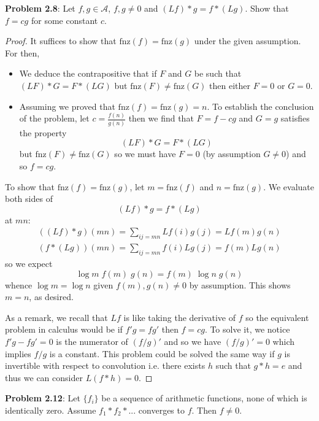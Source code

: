 \documentclass{article}
\newcommand{\fnz}{\text{fnz}}
\newcommand{\A}{\mathcal{A}}
\begin{document}
\textbf{Problem 2.8}: Let $f, g \in \A$, $f, g \not= 0$ and $(Lf) * g = f * (Lg)$. Show that $f = cg$ for some constant $c$.

\begin{proof}
It suffices to show that $\fnz(f) = \fnz(g)$ under the given assumption. For then,
\begin{itemize}
\item We deduce the contrapositive that if $F$ and $G$ be such that $(LF) * G = F * (LG)$ but $\fnz(F) \not= \fnz(G)$ then either $F = 0$ or $G = 0$.
\item Assuming we proved that $\fnz(f) = \fnz(g) = n$. To establish the conclusion of the problem, let $c = \frac{f(n)}{g(n)}$ then we find that $F = f - cg$ and $G = g$ satisfies the property
$$(L F) * G = F * (L G)$$
but $\fnz(F) \not= \fnz(G)$ so we must have $F = 0$ (by assumption $G \not= 0$) and so $f = cg$.
\end{itemize}

To show that $\fnz(f) = \fnz(g)$, let $m = \fnz(f)$ and $n = \fnz(g)$. We evaluate both sides of
$$(Lf) * g = f * (Lg)$$
at $mn$:
\begin{align*}
((Lf) * g) (mn) = \sum_{ij = mn} Lf(i) g(j) = Lf(m) g(n)\\
(f * (Lg)) (mn) = \sum_{ij = mn} f(i) Lg(j) = f(m) Lg(n)
\end{align*}
so we expect
$$\log m \; f(m) \; g(n) = f(m) \; \log n \; g(n)$$
whence $\log m = \log n$ given $f(m), g(n) \not= 0$ by assumption. This shows $m = n$, as desired.

As a remark, we recall that $Lf$ is like taking the derivative of $f$ so the equivalent problem in calculus would be if $f' g = f g'$ then $f = cg$. To solve it, we notice $f' g - f g' = 0$ is the numerator of $(f/g)'$ and so we have $(f/g)' = 0$ which implies $f/g$ is a constant. This problem could be solved the same way if $g$ is invertible with respect to convolution i.e. there exists $h$ such that $g * h = e$ and thus we can consider $L(f * h) = 0$.
\end{proof}

\textbf{Problem 2.12}: Let $\{f_i\}$ be a sequence of arithmetic functions, none of which is identically zero. Assume $f_1 * f_2 * ...$ converges to $f$. Then $f \not= 0$.
\end{document}
